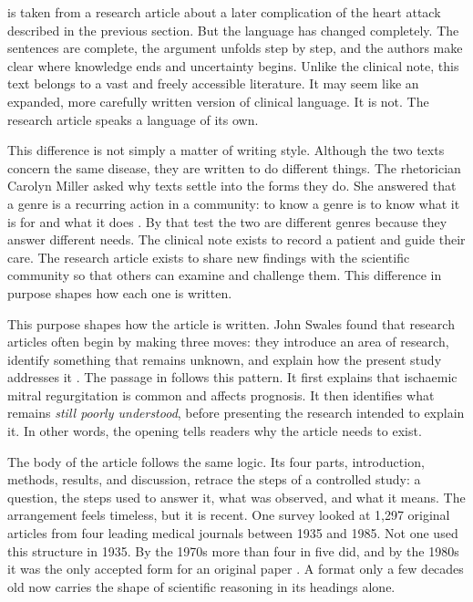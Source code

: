 \begin{reviewread}
 is taken from a research article about a later complication
of the heart attack described in the previous section. But the language has changed completely. The
sentences are complete, the argument unfolds step by step, and the authors make clear
where knowledge ends and uncertainty begins. Unlike the clinical note, this text
belongs to a vast and freely accessible literature. It may seem like an expanded, more
carefully written version of clinical language. It is not. The research article
speaks a language of its own.
\end{reviewread}

\begin{reviewread}
This difference is not simply a matter of writing style.
Although the two texts concern the same disease, they are written to do different things.
The rhetorician Carolyn Miller asked why texts settle into the forms they do.
She answered that a genre is a recurring action in a community: to know a genre is to know what it is for and what it does \citep{miller_genre_1984}.
By that test the two are different genres because they answer different needs.
The clinical note exists to record a patient and guide their care.
The research article exists to share new findings with the scientific community so that others can examine and challenge them.
This difference in purpose shapes how each one is written.
\end{reviewread}

\begin{reviewread}
This purpose shapes how the article is written.
John Swales found that research articles often begin by making three moves: they introduce an area of research, identify something that remains unknown, and explain how the present study addresses it \citep{swales_genre_1990}.
The passage in  follows this pattern.
It first explains that ischaemic mitral regurgitation is common and affects prognosis.
It then identifies what remains \emph{still poorly understood}, before presenting the research intended to explain it.
In other words, the opening tells readers why the article needs to exist.
\end{reviewread}

\begin{reviewread}
The body of the article follows the same logic.
Its four parts, introduction, methods, results, and discussion, retrace the steps of a controlled study: a question, the steps used to answer it, what was observed, and what it means.
The arrangement feels timeless, but it is recent.
One survey looked at 1{,}297 original articles from four leading medical journals between 1935 and 1985.
Not one used this structure in 1935.
By the 1970s more than four in five did, and by the 1980s it was the only accepted form for an original paper \citep{sollaci_imrad_2004}.
A format only a few decades old now carries the shape of scientific reasoning in its headings alone.
\end{reviewread}

